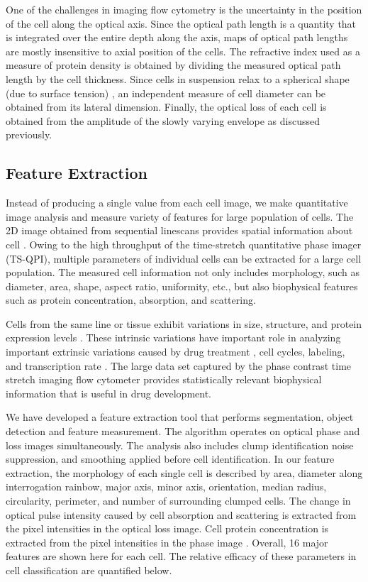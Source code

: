 \documentclass[aps,pra,reprint,superscriptaddress]{revtex4-1}
\begin{document}
One of the challenges in imaging flow cytometry is the uncertainty in the position of the cell along the optical axis. Since the optical path length is a quantity that is integrated over the entire depth along the axis, maps of optical path lengths are mostly insensitive to axial position of the cells. The refractive index used as a measure of protein density is obtained by dividing the measured optical path length by the cell thickness. Since cells in suspension relax to a spherical shape (due to surface tension) \cite{revel1974adhesion,whur1977substrate}, an independent measure of cell diameter can be obtained from its lateral dimension. Finally, the optical loss of each cell is obtained from the amplitude of the slowly varying envelope as discussed previously.

\subsection{Feature Extraction}

Instead of producing a single value from each cell image, we make quantitative image analysis and measure variety of features for large population of cells. The 2D image obtained from sequential linescans provides spatial information about cell \cite{mahjoubfar2013optically, driscoll2012automated}. Owing to the high throughput of the time-stretch quantitative phase imager (TS-QPI), multiple parameters of individual cells can be extracted for a large cell population. The measured cell information not only includes morphology, such as diameter, area, shape, aspect ratio, uniformity, etc., but also biophysical features such as protein concentration, absorption, and scattering.

Cells from the same line or tissue exhibit variations in size, structure, and protein expression levels \cite{kaern2005stochasticity, maheshri2007living, zangle2014live}. These intrinsic variations have important role in analyzing important extrinsic variations caused by drug treatment \cite{spencer2009non}, cell cycles, labeling, and transcription rate \cite{johnston2012mitochondrial}. The large data set captured by the phase contrast time stretch imaging flow cytometer provides statistically relevant biophysical information that is useful in drug development.

We have developed a feature extraction tool that performs segmentation, object detection and feature measurement. The algorithm operates on optical phase and loss images simultaneously. The analysis also includes clump identification noise suppression, and smoothing applied before cell identification. In our feature extraction, the morphology of each single cell is described by area, diameter along interrogation rainbow, major axis, minor axis, orientation, median radius, circularity, perimeter, and number of surrounding clumped cells. The change in optical pulse intensity caused by cell absorption and scattering is extracted from the pixel intensities in the optical loss image. Cell protein concentration is extracted from the pixel intensities in the phase image \cite{barer1953refractometry}. Overall, 16 major features are shown here for each cell. The relative efficacy of these parameters in cell classification are quantified below.
\end{document}
